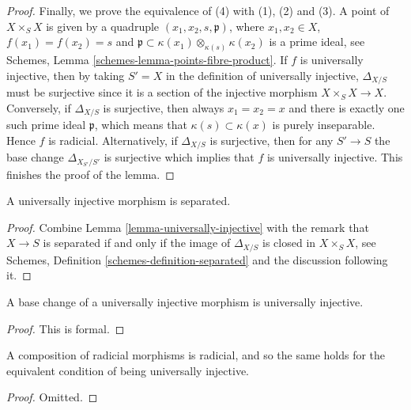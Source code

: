 \begin{proof}
\medskip\noindent
Finally, we prove the equivalence of (4) with (1), (2) and (3).
A point of $X \times_S X$ is given by a quadruple
$(x_1, x_2, s, \mathfrak p)$, where $x_1, x_2 \in X$,
$f(x_1) = f(x_2) = s$ and
$\mathfrak p \subset \kappa(x_1) \otimes_{\kappa(s)} \kappa(x_2)$
is a prime ideal, see
Schemes, Lemma \ref{schemes-lemma-points-fibre-product}.
If $f$ is universally injective, then
by taking $S'=X$ in the definition of universally injective,
$\Delta_{X/S}$ must be surjective since it is a section of
the injective morphism
$X \times_S X  \longrightarrow X$.
Conversely, if
$\Delta_{X/S}$ is surjective, then always $x_1 = x_2 = x$ and there
is exactly one such prime ideal $\mathfrak p$, which means that
$\kappa(s) \subset \kappa(x)$ is purely inseparable.
Hence $f$ is radicial.
Alternatively, if $\Delta_{X/S}$ is surjective,
then for any $S' \to S$ the base
change $\Delta_{X_{S'}/S'}$ is surjective which implies that $f$
is universally injective. This finishes the proof of the lemma.
\end{proof}

\begin{lemma}
\label{lemma-universally-injective-separated}
A universally injective morphism is separated.
\end{lemma}

\begin{proof}
Combine
Lemma \ref{lemma-universally-injective}
with the remark that $X \to S$ is separated if and only if the image
of $\Delta_{X/S}$ is closed in $X \times_S X$, see
Schemes, Definition \ref{schemes-definition-separated}
and the discussion following it.
\end{proof}

\begin{lemma}
\label{lemma-base-change-universally-injective}
A base change of a universally injective morphism is universally injective.
\end{lemma}

\begin{proof}
This is formal.
\end{proof}

\begin{lemma}
\label{lemma-composition-universally-injective}
A composition of radicial morphisms is radicial, and so the same holds
for the equivalent condition of being universally injective.
\end{lemma}

\begin{proof}
Omitted.
\end{proof}









